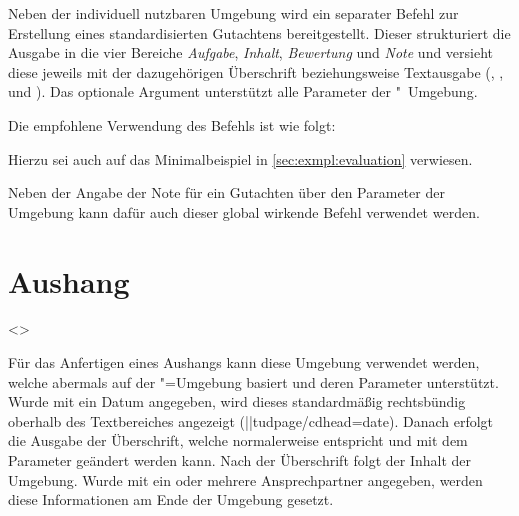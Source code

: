 \begin{DeclareEntity}{}
\begin{Declaration}
  {}
\printdeclarationlist
%
Neben der individuell nutzbaren Umgebung  wird ein 
separater Befehl zur Erstellung eines standardisierten Gutachtens 
bereitgestellt. Dieser strukturiert die Ausgabe in die vier Bereiche 
\emph{Aufgabe}, \emph{Inhalt}, \emph{Bewertung} und \emph{Note} und versieht 
diese jeweils mit der dazugehörigen Überschrift beziehungsweise Textausgabe 
(, ,  und 
). Das optionale Argument unterstützt alle Parameter der 
"~Umgebung.
\end{Declaration}
%
\begin{Example}
Die empfohlene Verwendung des Befehls  ist wie folgt:
\begin{Code}[escapechar=§]
\end{Code}
Hierzu sei auch auf das Minimalbeispiel in \autoref{sec:exmpl:evaluation} 
verwiesen.%
%
\end{Example}

\begin{Declaration}
  {}
\printdeclarationlist
%
Neben der Angabe der Note für ein Gutachten über den Parameter 
 der Umgebung  kann dafür 
auch dieser global wirkende Befehl verwendet werden.
\end{Declaration}



\section{%
  Aushang%
}
%
\begin{Declaration}
  {}
  <>
\begin{Declaration}
  {}
\printdeclarationlist
%
Für das Anfertigen eines Aushangs kann diese Umgebung verwendet werden, welche
abermals auf der "=Umgebung basiert und deren Parameter 
unterstützt. Wurde mit  ein Datum angegeben, wird dieses 
standardmäßig rechtsbündig oberhalb des Textbereiches angezeigt 
(\Environment||{tudpage/cdhead=date}). Danach erfolgt die Ausgabe der 
Überschrift, welche normalerweise  entspricht und mit dem 
Parameter  geändert werden kann. Nach der 
Überschrift folgt der Inhalt der Umgebung. Wurde mit  ein 
oder mehrere Ansprechpartner angegeben, werden diese Informationen am Ende der 
Umgebung gesetzt.
\end{Declaration}
\end{Declaration}


\end{DeclareEntity}
